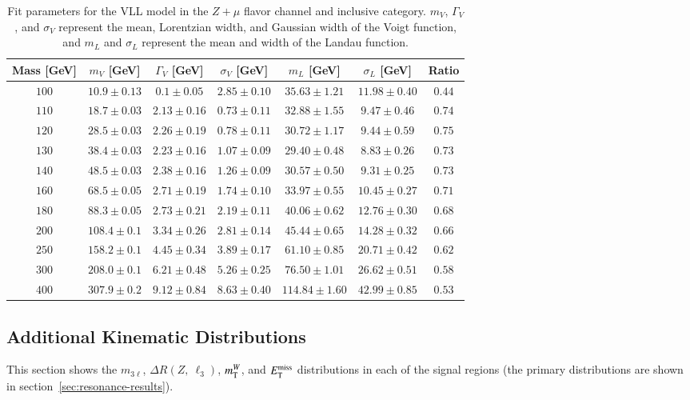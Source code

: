 \begin{table}[h]
 \centering
\scriptsize
\caption{Fit parameters for the VLL model in the $Z+\mu$ flavor channel and inclusive category. $m_V$, $\Gamma_V$, and $\sigma_V$ represent the mean, Lorentzian width, and Gaussian width of the Voigt function, and $m_L$ and $\sigma_L$ represent the mean and width of the Landau function.}
\begin{tabular}{|c||c|c|c|c|c|c|} 
 \hline\hline
Mass [GeV] & $m_V$ [GeV] &  $\Gamma_V$ [GeV] &  $\sigma_V$ [GeV] & $m_L$  [GeV] & $\sigma_L$ [GeV] & Ratio\\
\hline \hline
$100$&$10.9\pm0.13 $&$ 0.1\pm0.05 $&$ 2.85\pm0.10 $&$ 35.63\pm1.21 $&$ 11.98\pm0.40$&$0.44$\\
$110$&$18.7\pm0.03$&$ 2.13\pm0.16 $&$ 0.73\pm0.11 $&$ 32.88\pm1.55 $&$ 9.47\pm0.46$&$0.74$\\
$120$&$28.5\pm0.03 $&$ 2.26\pm0.19 $&$ 0.78\pm0.11 $&$ 30.72\pm1.17 $&$ 9.44\pm0.59$&$0.75$\\
$130$&$38.4\pm0.03 $&$ 2.23\pm0.16 $&$ 1.07\pm0.09 $&$ 29.40\pm0.48 $&$ 8.83\pm0.26$&$0.73$\\
$140$&$48.5\pm0.03$&$ 2.38\pm0.16 $&$ 1.26\pm0.09 $&$ 30.57\pm0.50 $&$ 9.31\pm0.25$&$0.73$\\
$160$&$68.5\pm0.05 $&$ 2.71\pm0.19 $&$ 1.74\pm0.10 $&$ 33.97\pm0.55 $&$ 10.45\pm0.27$&$0.71$\\
$180$&$88.3\pm0.05 $&$ 2.73\pm0.21 $&$ 2.19\pm0.11 $&$ 40.06\pm0.62 $&$ 12.76\pm0.30$&$0.68$\\
$200$&$108.4\pm0.1 $&$ 3.34\pm0.26 $&$ 2.81\pm0.14 $&$ 45.44\pm0.65 $&$ 14.28\pm0.32$&$0.66$\\
$250$&$158.2\pm0.1 $&$ 4.45\pm0.34 $&$ 3.89\pm0.17 $&$ 61.10\pm0.85 $&$ 20.71\pm0.42$&$0.62$\\
$300$&$208.0\pm0.1 $&$ 6.21\pm0.48 $&$ 5.26\pm0.25 $&$ 76.50\pm1.01 $&$ 26.62\pm0.51$&$0.58$\\
$400$&$307.9\pm0.2 $&$ 9.12\pm0.84 $&$ 8.63\pm0.40 $&$ 114.84\pm1.60 $&$ 42.99\pm0.85$&$0.53$\\
\hline\hline
\end{tabular} 
   \label{table:ZmuFitParamsVLL}
\end{table}



\subsection{Additional Kinematic Distributions}\label{sec:appendix-resonance-SR-distributions}
This section shows the $m_{3\ell}$, $\Delta R(Z,\ \ell_3)$, $m_{\mathrm{T}}^W$, and $E_{\text{T}}^{\text{miss}}$ distributions in each of the signal regions (the primary distributions are shown in section~\ref{sec:resonance-results}).

